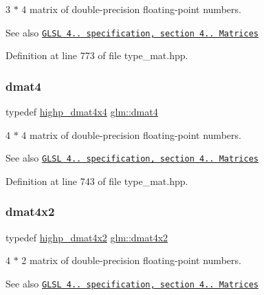3 $\ast$ 4 matrix of double-\/precision floating-\/point numbers.

\begin{DoxySeeAlso}{See also}
\href{http://www.opengl.org/registry/doc/GLSLangSpec.4.20.8.pdf}{\tt G\+L\+SL 4.. specification, section 4.. Matrices} 
\end{DoxySeeAlso}


Definition at line 773 of file type\+\_\+mat.\+hpp.

\mbox{\label{group__core__types_ga7f7c1300ebfd19d573e9deb1e8758b54}} 
\subsubsection{\texorpdfstring{dmat4}{dmat4}}
{\footnotesize\ttfamily typedef \hyperlink{group__core__precision_ga1c0a2edbde597b59e9005691a224b208}{highp\+\_\+dmat4x4} \hyperlink{group__core__types_ga7f7c1300ebfd19d573e9deb1e8758b54}{glm\+::dmat4}}

4 $\ast$ 4 matrix of double-\/precision floating-\/point numbers.

\begin{DoxySeeAlso}{See also}
\href{http://www.opengl.org/registry/doc/GLSLangSpec.4.20.8.pdf}{\tt G\+L\+SL 4.. specification, section 4.. Matrices} 
\end{DoxySeeAlso}


Definition at line 743 of file type\+\_\+mat.\+hpp.

\mbox{\label{group__core__types_gab3d51ce41e6f0aa267d3e185cee09c44}} 
\subsubsection{\texorpdfstring{dmat4x2}{dmat4x2}}
{\footnotesize\ttfamily typedef \hyperlink{group__core__precision_gaa4fb1ed350a6cd053abb9b093d13ce0d}{highp\+\_\+dmat4x2} \hyperlink{group__core__types_gab3d51ce41e6f0aa267d3e185cee09c44}{glm\+::dmat4x2}}

4 $\ast$ 2 matrix of double-\/precision floating-\/point numbers.

\begin{DoxySeeAlso}{See also}
\href{http://www.opengl.org/registry/doc/GLSLangSpec.4.20.8.pdf}{\tt G\+L\+SL 4.. specification, section 4.. Matrices} 
\end{DoxySeeAlso}


